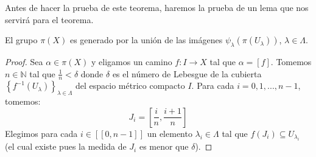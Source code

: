\documentclass[12pt]{report}
\theoremstyle{largebreak}
\newcommand\cf[3]{\ensuremath{#1:#2\rightarrow#3}}
\newcommand\natint[1]{\ensuremath{\left[\!\left[ #1\right]\!\right]}}
\begin{document}
    Antes de hacer la prueba de este teorema, haremos la prueba de un lema que nos servirá para el teorema.

    \begin{lema}
        El grupo $\pi(X)$ es generado por la unión de las imágenes $\psi_\lambda\left(\pi(U_\lambda)\right)$, $\lambda\in\Lambda$.
    \end{lema}

    \begin{proof}
        Sea $\alpha\in\pi(X)$ y eligamos un camino $\cf{f}{I}{X}$ tal que $\alpha=[f]$. Tomemos $n\in\mathbb{N}$ tal que $\frac{1}{n}<\delta$ donde $\delta$ es el número de Lebesgue de la cubierta $\left\{f^{-1}(U_\lambda) \right\}_{\lambda\in\Lambda}$ del espacio métrico compacto $I$. Para cada $i=0,1,...,n-1$, tomemos:
        \begin{equation*}
            J_i=\left[\frac{i}{n},\frac{i+1}{n} \right]
        \end{equation*}
        Elegimos para cada $i\in\natint{0,n-1}$ un elemento $\lambda_i\in\Lambda$ tal que $f(J_i)\subseteq U_{\lambda_i}$ (el cual existe pues la medida de $J_i$ es menor que $\delta$).


\end{proof}
\end{document}
